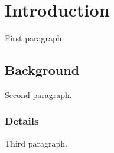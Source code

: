 \section{Introduction}

First paragraph.

\subsection{Background}

Second paragraph.

\subsubsection{Details}

Third paragraph.
